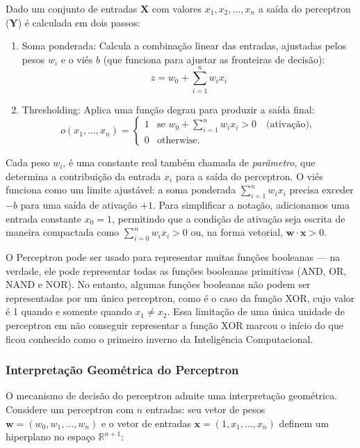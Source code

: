 \documentclass{article}
\begin{document}
Dado um conjunto de entradas $\mathbf{X}$ com valores $x_1, x_2, ..., x_n$ a saída do perceptron ($\mathbf{Y}$) é calculada em dois passos:
\begin{enumerate}
    \item Soma ponderada: Calcula a combinação linear das entradas, ajustadas pelos pesos $w_i$ e o viés $b$ (que funciona para ajustar as fronteiras de decisão):
    \begin{equation}
        z = w_0 + \sum_{i=1}^{n}w_ix_i
    \end{equation}
    \item Thresholding: Aplica uma função degrau para produzir a saída final:
    \begin{equation} \label{perceptron}
    o(x_1, \dots, x_n) =
    \begin{cases}
    1 & \text{se } w_0 + \sum_{i=1}^n w_i x_i > 0 \quad \text{(ativação)}, \\ 0 & \text{otherwise.}
    \end{cases}
    \end{equation}
\end{enumerate}

Cada peso \( w_i \), é uma constante real também chamada de \textit{parâmetro}, que determina a contribuição da entrada $x_i$ para a saída do perceptron. O viés funciona como um limite ajustável: a soma ponderada $\sum_{i=1}^n w_i x_i$ precisa exceder $-b$ para uma saída de ativação $+1$. Para simplificar a notação, adicionamos uma entrada constante $x_0 = 1$, permitindo que a condição de ativação seja escrita de maneira compactada como $\sum_{i=0}^n w_i x_i > 0$ ou, na forma vetorial, $\mathbf{w} \cdot \mathbf{x} > 0$.

O Perceptron pode ser usado para representar muitas funções booleanas — na verdade, ele pode representar todas as funções booleanas primitivas (AND, OR, NAND e NOR). No entanto, algumas funções booleanas não podem ser representadas por um único perceptron, como é o caso da função XOR, cujo valor é 1 quando e somente quando $x_1 \neq x_2$. Essa limitação de uma única unidade de perceptron em não conseguir representar a função XOR marcou o início do que ficou conhecido como o primeiro inverno da Inteligência Computacional.


\subsubsection{Interpretação Geométrica do Perceptron}

O mecanismo de decisão do perceptron admite uma interpretação geométrica. Considere um perceptron com $n$ entradas: seu vetor de pesos $\mathbf{w} = (w_0, w_1, ..., w_n)$ e o vetor de entradas $\mathbf{x} = (1, x_1, ..., x_n)$ definem um hiperplano no espaço $\mathbb{R}^{n+1}$:
\end{document}
